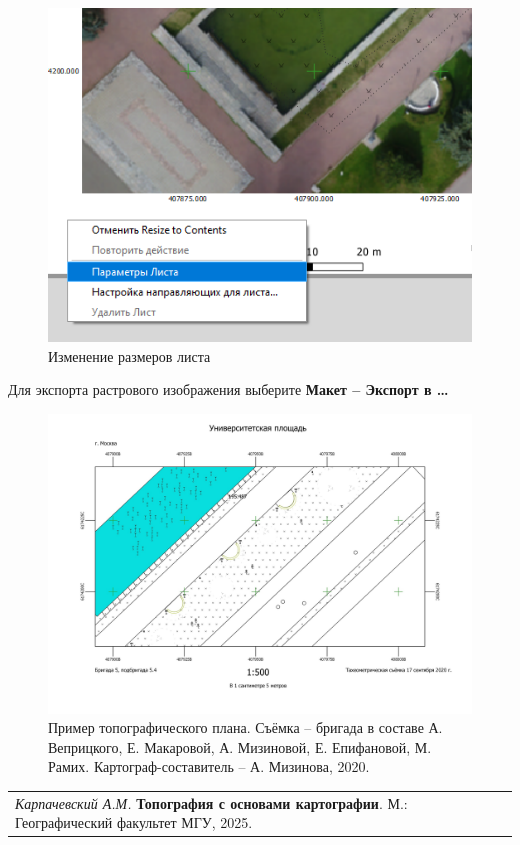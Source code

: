 \documentclass[
  12pt,
]{book}
\begin{document}
\begin{figure}
\centering
\includegraphics{images/symbology/Layout_size.png}
\caption{Изменение размеров листа}
\end{figure}

Для экспорта растрового изображения выберите \textbf{Макет -- Экспорт в \ldots{}}

\begin{figure}
\centering
\includegraphics{images/symbology/Topo.jpg}
\caption{Пример топографического плана. Съёмка -- бригада в составе А. Веприцкого, Е. Макаровой, А. Мизиновой, Е. Епифановой, М. Рамих. Картограф-составитель -- А. Мизинова, 2020.}
\end{figure}

\begin{longtable}[]{@{}l@{}}
\toprule\noalign{}
\endhead
\bottomrule\noalign{}
\endlastfoot
\emph{Карпачевский А.М.} \textbf{Топография с основами картографии}. М.: Географический факультет МГУ, 2025. \\
\end{longtable}
\end{document}

